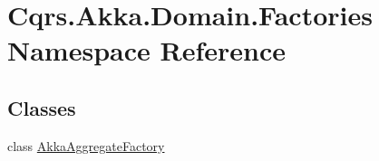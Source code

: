 \hypertarget{namespaceCqrs_1_1Akka_1_1Domain_1_1Factories}{}\section{Cqrs.\+Akka.\+Domain.\+Factories Namespace Reference}
\label{namespaceCqrs_1_1Akka_1_1Domain_1_1Factories}
\subsection*{Classes}
\begin{DoxyCompactItemize}
\item 
class \hyperlink{classCqrs_1_1Akka_1_1Domain_1_1Factories_1_1AkkaAggregateFactory}{Akka\+Aggregate\+Factory}
\end{DoxyCompactItemize}
